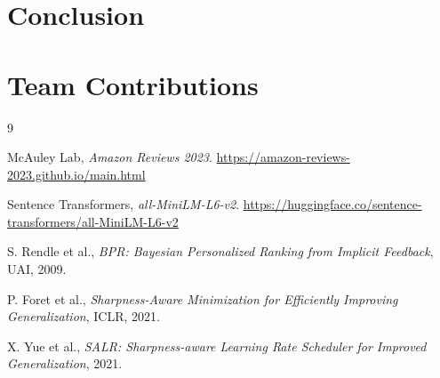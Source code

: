\documentclass[12pt,a4paper]{article}
\begin{document}
\section{Conclusion}
\label{sec:conclusion}

\section{Team Contributions}

\begin{thebibliography}{9}

McAuley Lab,
\textit{Amazon Reviews 2023}.
\url{https://amazon-reviews-2023.github.io/main.html}

Sentence Transformers,
\textit{all-MiniLM-L6-v2}.
\url{https://huggingface.co/sentence-transformers/all-MiniLM-L6-v2}

S. Rendle et al.,
\textit{BPR: Bayesian Personalized Ranking
from Implicit Feedback},
UAI, 2009.

P. Foret et al.,
\textit{Sharpness-Aware Minimization
for Efficiently Improving Generalization},
ICLR, 2021.

X. Yue et al.,
\textit{SALR: Sharpness-aware Learning Rate
Scheduler for Improved Generalization},
2021.

\end{thebibliography}
\end{document}
